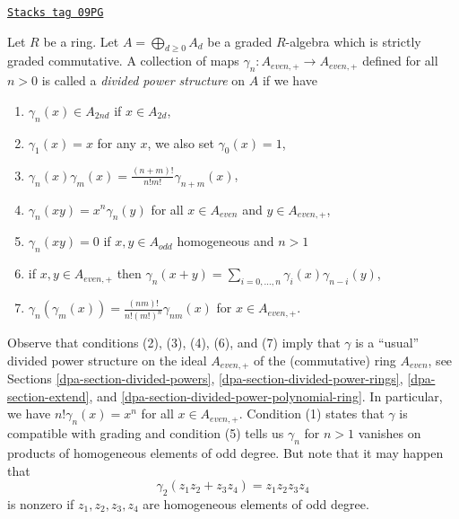\begin{definition}
\label{dpa-definition-divided-powers-graded}
\href{https://stacks.math.columbia.edu/tag/09PG}{\texttt{Stacks tag 09PG}}

Let $R$ be a ring. Let $A = \bigoplus_{d \geq 0} A_d$ be a graded
$R$-algebra which is strictly graded commutative. A collection of maps
$\gamma_n : A_{even, +} \to A_{even, +}$ defined for all $n > 0$ is called
a {\it divided power structure} on $A$ if we have
\begin{enumerate}
\item $\gamma_n(x) \in A_{2nd}$ if $x \in A_{2d}$,
\item $\gamma_1(x) = x$ for any $x$, we also set $\gamma_0(x) = 1$,
\item $\gamma_n(x)\gamma_m(x) = \frac{(n + m)!}{n! m!} \gamma_{n + m}(x)$,
\item $\gamma_n(xy) = x^n \gamma_n(y)$ for all $x \in A_{even}$ and
$y \in A_{even, +}$,
\item $\gamma_n(xy) = 0$ if $x, y \in A_{odd}$ homogeneous and $n > 1$
\item if $x, y \in A_{even, +}$ then
$\gamma_n(x + y) = \sum_{i = 0, \ldots, n} \gamma_i(x)\gamma_{n - i}(y)$,
\item $\gamma_n(\gamma_m(x)) =
\frac{(nm)!}{n! (m!)^n} \gamma_{nm}(x)$ for $x \in A_{even, +}$.
\end{enumerate}
\end{definition}

Observe that conditions (2), (3), (4), (6), and (7) imply that
$\gamma$ is a ``usual'' divided power structure on the ideal
$A_{even, +}$ of the (commutative) ring $A_{even}$, see
Sections \ref{dpa-section-divided-powers},
\ref{dpa-section-divided-power-rings},
\ref{dpa-section-extend}, and
\ref{dpa-section-divided-power-polynomial-ring}.
In particular, we have $n! \gamma_n(x) = x^n$ for all $x \in A_{even, +}$.
Condition (1) states that $\gamma$ is compatible with grading and condition
(5) tells us $\gamma_n$ for $n > 1$ vanishes on products
of homogeneous elements of odd degree. But note that it may happen
that
$$
\gamma_2(z_1 z_2 + z_3 z_4) = z_1z_2z_3z_4
$$
is nonzero if $z_1, z_2, z_3, z_4$ are homogeneous elements of odd degree.

